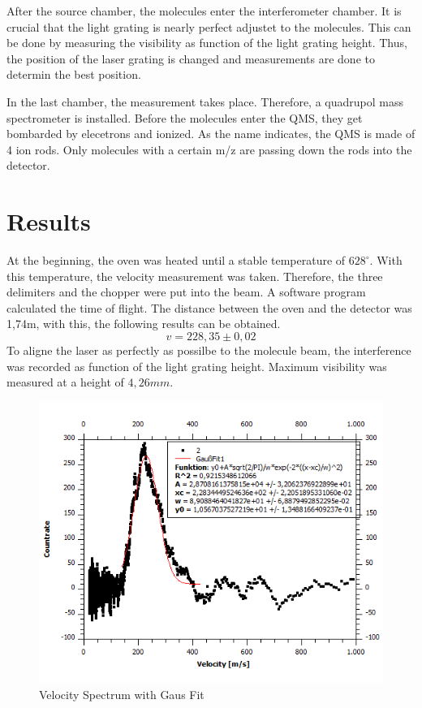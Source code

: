 \documentclass[12pt,a4paper]{article}
\begin{document}
\begin{multicols}{2}
After the source chamber, the molecules enter the interferometer chamber. It is crucial that the light grating is nearly perfect adjustet to the molecules. This can be done by measuring the visibility as function of the light grating height. Thus, the position of the laser grating is changed and measurements are done to determin the best position.

In the last chamber, the measurement takes place. Therefore, a quadrupol mass spectrometer is installed. Before the molecules enter the QMS, they get bombarded by elecetrons and ionized. As the name indicates, the QMS is made of 4 ion rods. Only molecules with a certain m/z are passing down the rods into the detector. 



\section{Results}
At the beginning, the oven was heated until a stable temperature of $628^\circ$. With this temperature, the velocity measurement was taken. Therefore, the three delimiters and the chopper were put into the beam. A software program calculated the time of flight. The distance between the oven and the detector was 1,74m, with this, the following results can be obtained.
$$v=228,35\pm0,02$$
To aligne the laser as perfectly as possilbe to the molecule beam, the interference was recorded as function of the light grating height. Maximum visibility was measured at a height of $4,26 mm$.
\end{multicols}
\begin{figure}[H]
 \centering
\includegraphics[scale=0.65]{./data/Vel_Spectrum.png}
\caption{Velocity Spectrum with Gaus Fit}
\label{fig:Velocity Spectrum}
\end{figure}
\end{document}
